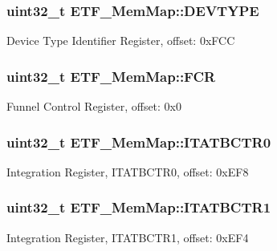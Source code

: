 \subsubsection[{D\+E\+V\+T\+Y\+P\+E}]{\setlength{\rightskip}{0pt plus 5cm}uint32\+\_\+t E\+T\+F\+\_\+\+Mem\+Map\+::\+D\+E\+V\+T\+Y\+P\+E}\label{struct_e_t_f___mem_map_a6bc4c22708e71bde72f0c04236c471c5}
Device Type Identifier Register, offset\+: 0x\+F\+C\+C \hypertarget{struct_e_t_f___mem_map_ad893993c7fca4a17b0e50d48283dc8a4}{}
\subsubsection[{F\+C\+R}]{\setlength{\rightskip}{0pt plus 5cm}uint32\+\_\+t E\+T\+F\+\_\+\+Mem\+Map\+::\+F\+C\+R}\label{struct_e_t_f___mem_map_ad893993c7fca4a17b0e50d48283dc8a4}
Funnel Control Register, offset\+: 0x0 \hypertarget{struct_e_t_f___mem_map_a25f602259e8235c0a7d5a95d27a0ad8d}{}
\subsubsection[{I\+T\+A\+T\+B\+C\+T\+R0}]{\setlength{\rightskip}{0pt plus 5cm}uint32\+\_\+t E\+T\+F\+\_\+\+Mem\+Map\+::\+I\+T\+A\+T\+B\+C\+T\+R0}\label{struct_e_t_f___mem_map_a25f602259e8235c0a7d5a95d27a0ad8d}
Integration Register, I\+T\+A\+T\+B\+C\+T\+R0, offset\+: 0x\+E\+F8 \hypertarget{struct_e_t_f___mem_map_a43cd2057b8fcb847375a18e4638f923e}{}
\subsubsection[{I\+T\+A\+T\+B\+C\+T\+R1}]{\setlength{\rightskip}{0pt plus 5cm}uint32\+\_\+t E\+T\+F\+\_\+\+Mem\+Map\+::\+I\+T\+A\+T\+B\+C\+T\+R1}\label{struct_e_t_f___mem_map_a43cd2057b8fcb847375a18e4638f923e}
Integration Register, I\+T\+A\+T\+B\+C\+T\+R1, offset\+: 0x\+E\+F4 \hypertarget{struct_e_t_f___mem_map_ab6920fa131f508ff5a9b6817be95bed5}{}
